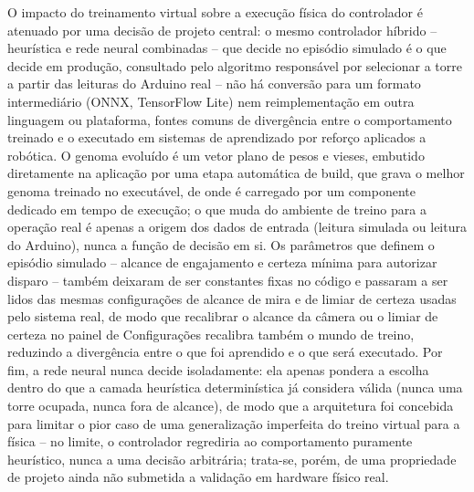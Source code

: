 \documentclass[12pt,a4paper]{article}
\begin{document}
O impacto do treinamento virtual sobre a execução física do controlador é atenuado por uma decisão
de projeto central: o mesmo controlador híbrido -- heurística e rede neural combinadas -- que
decide no episódio simulado é o que decide em produção, consultado pelo algoritmo responsável por
selecionar a torre a partir das leituras do Arduino real -- não há conversão para um formato
intermediário (ONNX, TensorFlow Lite) nem reimplementação em outra linguagem ou plataforma, fontes
comuns de divergência entre o comportamento treinado e o executado em sistemas de aprendizado por
reforço aplicados a robótica. O genoma evoluído é um vetor plano de pesos e vieses, embutido
diretamente na aplicação por uma etapa automática de build, que grava o melhor genoma treinado no
executável, de onde é carregado por um componente dedicado em tempo de execução; o que muda do
ambiente de treino para a operação real é apenas a origem dos dados de entrada (leitura simulada
ou leitura do Arduino), nunca a função de decisão em si. Os parâmetros que definem o episódio
simulado -- alcance de engajamento e certeza mínima para autorizar disparo -- também deixaram de
ser constantes fixas no código e passaram a ser lidos das mesmas configurações de alcance de mira
e de limiar de certeza usadas pelo sistema real, de modo que recalibrar o alcance da câmera ou o
limiar de certeza no painel de Configurações recalibra também o mundo de treino, reduzindo a
divergência entre o que foi aprendido e o que será executado. Por fim, a rede neural nunca decide
isoladamente: ela apenas pondera a escolha dentro do que a camada heurística determinística já
considera válida (nunca uma torre ocupada, nunca fora de alcance), de modo que a arquitetura foi
concebida para limitar o pior caso de uma generalização imperfeita do treino virtual para a física
-- no limite, o controlador regrediria ao comportamento puramente heurístico, nunca a uma decisão
arbitrária; trata-se, porém, de uma propriedade de projeto ainda não submetida a validação em
hardware físico real.
\end{document}
